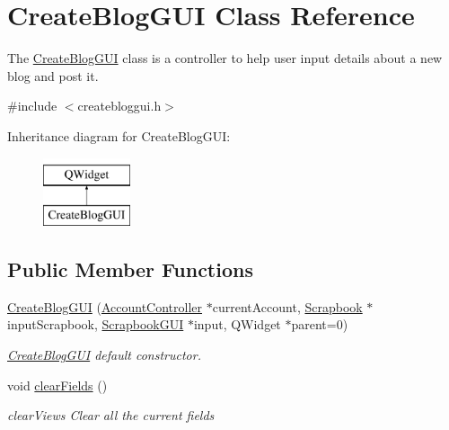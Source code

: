 \hypertarget{classCreateBlogGUI}{}\section{Create\+Blog\+G\+UI Class Reference}
\label{classCreateBlogGUI}


The \hyperlink{classCreateBlogGUI}{Create\+Blog\+G\+UI} class is a controller to help user input details about a new blog and post it.  




{\ttfamily \#include $<$createbloggui.\+h$>$}

Inheritance diagram for Create\+Blog\+G\+UI\+:\begin{figure}[H]
\begin{center}
\leavevmode
\includegraphics[height=2.000000cm]{classCreateBlogGUI}
\end{center}
\end{figure}
\subsection*{Public Member Functions}
\begin{DoxyCompactItemize}
\item 
\hyperlink{classCreateBlogGUI_af4dde1b073ae637d352cdf2c89dff5e9}{Create\+Blog\+G\+UI} (\hyperlink{classAccountController}{Account\+Controller} $\ast$current\+Account, \hyperlink{classScrapbook}{Scrapbook} $\ast$input\+Scrapbook, \hyperlink{classScrapbookGUI}{Scrapbook\+G\+UI} $\ast$input, Q\+Widget $\ast$parent=0)
\begin{DoxyCompactList}\small\item\em \hyperlink{classCreateBlogGUI}{Create\+Blog\+G\+UI} default constructor. \end{DoxyCompactList}\item 
void \hyperlink{classCreateBlogGUI_a9dad565c42fcc58b4b038b4217c87cb8}{clear\+Fields} ()\hypertarget{classCreateBlogGUI_a9dad565c42fcc58b4b038b4217c87cb8}{}\label{classCreateBlogGUI_a9dad565c42fcc58b4b038b4217c87cb8}

\begin{DoxyCompactList}\small\item\em clear\+Views Clear all the current fields \end{DoxyCompactList}\end{DoxyCompactItemize}


